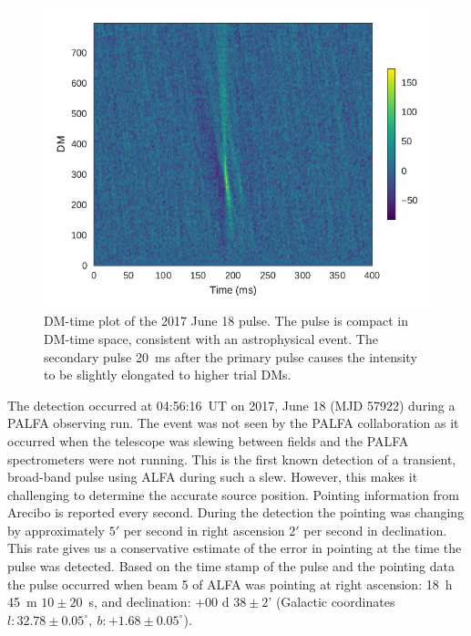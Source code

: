 \documentclass[a4paper,fleqn,usenatbib]{mnras}
\begin{document}
\begin{figure}
    \includegraphics[width=1.0\linewidth]{figures/Beam5_fb_D20170618T005616_buffer2_dmspace.pdf}
    \caption{DM-time plot of the 2017 June 18 pulse. The pulse is compact in
    DM-time space, consistent with an astrophysical event. The secondary pulse
    20~ms after the primary pulse causes the intensity to be slightly elongated
    to higher trial DMs.
    }
    \label{fig:D20170618_dmspace}
\end{figure}

The detection occurred at 04:56:16~UT on 2017, June 18 (MJD 57922) during a
PALFA observing run. The event was not seen by the PALFA collaboration as it
occurred when the telescope was slewing between fields and the PALFA
spectrometers were not running. This is the first known detection of a
transient, broad-band pulse using ALFA during such a slew. However, this makes
it challenging to determine the accurate source position. Pointing information
from Arecibo is reported every second.  During the detection the pointing was
changing by approximately $5'$ per second in right ascension $2'$
per second in declination. This rate gives us a conservative estimate
of the error in pointing at the time the pulse was detected. Based on the time
stamp of the pulse and the pointing data the pulse occurred when beam 5 of ALFA
was pointing at right ascension: 18~h 45~m $10 \pm 20$~s, and declination: +00 d
$38 \pm 2$' (Galactic coordinates $l: 32.78 \pm 0.05^{\circ}, ~b: +1.68 \pm
0.05^{\circ}$).
\end{document}
